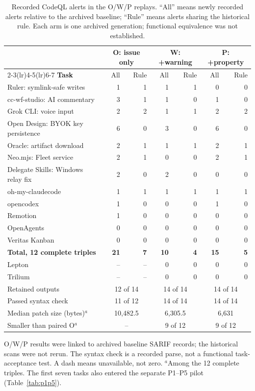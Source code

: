 \begin{table}[!tbp]
\caption{Recorded CodeQL alerts in the O/W/P replays. ``All'' means newly recorded alerts relative to the archived baseline; ``Rule'' means alerts sharing the historical rule. Each arm is one archived generation; functional equivalence was not established.}
\label{tab:replays}
\centering\small
\begin{tabular}{@{}lrrrrrr@{}}
\toprule
& \multicolumn{2}{c}{\textbf{O: issue only}} & \multicolumn{2}{c}{\textbf{W: +warning}} & \multicolumn{2}{c}{\textbf{P: +property}}\\
\cmidrule(lr){2-3}\cmidrule(lr){4-5}\cmidrule(lr){6-7}
\textbf{Task} & All & Rule & All & Rule & All & Rule\\
\midrule
Ruler: symlink-safe writes & 1 & 1 & 1 & 1 & 0 & 0\\
cc-wf-studio: AI commentary & 3 & 1 & 1 & 0 & 1 & 0\\
Grok CLI: voice input & 2 & 2 & 1 & 1 & 2 & 2\\
Open Design: BYOK key persistence & 6 & 0 & 3 & 0 & 6 & 0\\
Oracle: artifact download & 2 & 1 & 1 & 1 & 2 & 1\\
Neo.mjs: Fleet service & 2 & 1 & 0 & 0 & 2 & 1\\
Delegate Skills: Windows relay fix & 2 & 0 & 2 & 0 & 0 & 0\\
oh-my-claudecode & 1 & 1 & 1 & 1 & 1 & 1\\
opencodex & 1 & 0 & 0 & 0 & 1 & 0\\
Remotion & 1 & 0 & 0 & 0 & 0 & 0\\
OpenAgents & 0 & 0 & 0 & 0 & 0 & 0\\
Veritas Kanban & 0 & 0 & 0 & 0 & 0 & 0\\
\midrule
\textbf{Total, 12 complete triples} & \textbf{21} & \textbf{7} & \textbf{10} & \textbf{4} & \textbf{15} & \textbf{5}\\
Lepton & -- & -- & 0 & 0 & 0 & 0\\
Trilium & -- & -- & 0 & 0 & 0 & 0\\
\midrule
Retained outputs & \multicolumn{2}{c}{12 of 14} & \multicolumn{2}{c}{14 of 14} & \multicolumn{2}{c}{14 of 14}\\
Passed syntax check & \multicolumn{2}{c}{11 of 12} & \multicolumn{2}{c}{14 of 14} & \multicolumn{2}{c}{14 of 14}\\
Median patch size (bytes)$^a$ & \multicolumn{2}{c}{10,482.5} & \multicolumn{2}{c}{6,305.5} & \multicolumn{2}{c}{6,631}\\
Smaller than paired O$^a$ & \multicolumn{2}{c}{--} & \multicolumn{2}{c}{9 of 12} & \multicolumn{2}{c}{9 of 12}\\
\bottomrule
\end{tabular}
\par\smallskip\raggedright\footnotesize O/W/P results were linked to archived baseline SARIF records; the historical scans were not rerun. The syntax check is a recorded parse, not a functional task-acceptance test. A dash means unavailable, not zero. $^a$Among the 12 complete triples. The first seven tasks also entered the separate P1--P5 pilot (Table~\ref{tab:p1p5}).
\end{table}
